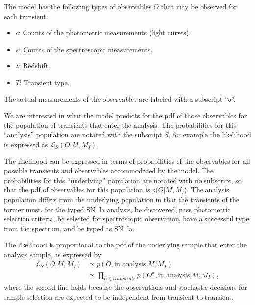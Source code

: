 \documentclass[preprint,3p]{elsarticle}
\begin{document}
The model has the following types of observables $O$ that
may be observed for each transient:
\begin{itemize}
\item $c$: Counts of the photometric measurements (light curves).
\item $s$: Counts of the spectroscopic measurements.
\item $z$: Redshift.
\item $T$: Transient type.
\end{itemize}
The actual measurements of the observables are labeled  with a subscript ``o''.


We are interested in what the model predicts for the pdf of those observables
for the population of transients that enter the analysis.  
The probabilities for this ``analysis'' population are notated with the
subscript $S$, for example the likelihood is expressed as $\mathcal{L}_S(O| M, M_I)$.

The likelihood can be expressed in terms of probabilities of the observables
for all possible transients and observables accommodated by the model.
The probabilities for this ``underlying'' population are notated with no subscript,
so that the pdf of observables for this population is $p(O|M, M_I$).
The analysis population differs from the underlying population in that the transients of the former 
must, for the typed SN~Ia analysis, be discovered, pass photometric selection criteria, be selected for spectroscopic
observation, have a successful type from the spectrum, and be typed as SN~Ia.

The likelihood is proportional to the pdf of the underlying sample that
enter the analysis sample, as expressed by
\begin{align}
\mathcal{L}_S(O | M, M_I) & \propto p(O, \text{in analysis}|M, M_I)\\
&  \propto \prod_{\alpha \in transients} p(O^\alpha, \text{in analysis}|M, M_I),
\end{align}
where the second line holds because the observations and stochastic decisions
for sample selection are expected to be independent from transient to transient.
\end{document}
